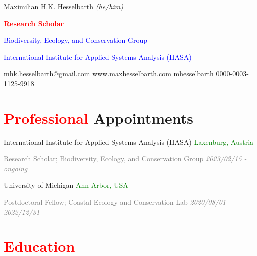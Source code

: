 \documentclass[hidelinks]{report}
\begin{document}

\begin{center}

\huge Maximilian H.K. Hesselbarth \small{\textit{(he/him)}}

\textcolor{red}{\small{\textbf{Research Scholar}}}

\textcolor{blue}{\small{Biodiversity, Ecology, and Conservation Group}}

\textcolor{blue}{\small{International Institute for Applied Systems Analysis (IIASA)}}

\small{
	\faEnvelope \hspace{0.1em} \href{mailto:mhk.hesselbarth@gmail.com}{mhk.hesselbarth@gmail.com} \hspace{1em}
	\faHome \href{https://www.maxhesselbarth.com}{\hspace{0.1em} www.maxhesselbarth.com} \hspace{1em}
	\faGithub \href{https://github.com/mhesselbarth}{\hspace{0.1em} mhesselbarth} \hspace{1em}
	\textcolor{orc}{\aiOrcid} \href{https://orcid.org/0000-0003-1125-9918}{\hspace{0.1em} 0000-0003-1125-9918}
}

\end{center}

 

\section*{\textcolor{red}{Professional} Appointments \sout{\hfill}}

International Institute for Applied Systems Analysis (IIASA)
\hfill
\textcolor{green}{Laxenburg, Austria}

\textcolor{grey}{\footnotesize{Research Scholar; Biodiversity, Ecology, and Conservation Group}}
\hfill
\textcolor{grey}{\textit{2023/02/15 - ongoing}}

University of Michigan
\hfill
\textcolor{green}{Ann Arbor, USA}

\textcolor{grey}{\footnotesize{Postdoctoral Fellow; Coastal Ecology and Conservation Lab}}
\hfill
\textcolor{grey}{\textit{2020/08/01 - 2022/12/31}}


\section*{\textcolor{red}{Education} \sout{\hfill}}
\end{document}

